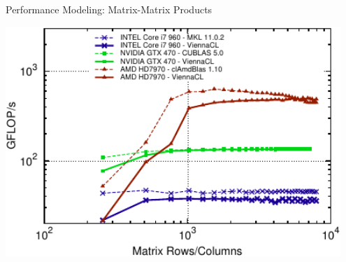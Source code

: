  

\begin{frame}{Performance Modeling: Matrix-Matrix Products}


 \begin{center}
  \includegraphics[width=0.95\textwidth]{figures/dgemm}
 \end{center}
 
 \end{frame}


